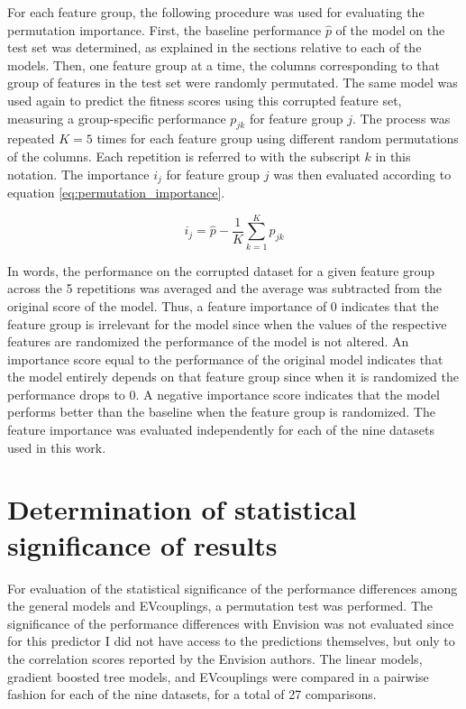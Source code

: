 For each feature group, the following procedure was used for evaluating the permutation importance.
First, the baseline performance $\hat{p}$ of the model on the test set was determined, as explained in the sections relative to each of the models.
Then, one feature group at a time, the columns corresponding to that group of features in the test set were randomly permutated.
The same model was used again to predict the fitness scores using this corrupted feature set, measuring a group-specific performance $p_{jk}$ for feature group $j$.
The process was repeated $K=5$ times for each feature group using different random permutations of the columns.
Each repetition is referred to with the subscript $k$ in this notation.
The importance $i_j$ for feature group $j$ was then evaluated according to equation \autoref{eq:permutation_importance}.

\begin{equation}\label{eq:permutation_importance}
	i_j = \hat{p} - \frac{1}{K} \sum_{k=1}^K p_{jk}
\end{equation}

In words, the performance on the corrupted dataset for a given feature group across the \num{5} repetitions was averaged and the average was subtracted from the original score of the model.
Thus, a feature importance of \num{0} indicates that the feature group is irrelevant for the model since when the values of the respective features are randomized the performance of the model is not altered.
An importance score equal to the performance of the original model indicates that the model entirely depends on that feature group since when it is randomized the performance drops to \num{0}.
A negative importance score indicates that the model performs better than the baseline when the feature group is randomized.
The feature importance was evaluated independently for each of the nine datasets used in this work.

\section{Determination of statistical significance of results}\label{mm:significance}
For evaluation of the statistical significance of the performance differences among the general models and EVcouplings, a permutation test was performed.
The significance of the performance differences with Envision was not evaluated since for this predictor I did not have access to the predictions themselves, but only to the correlation scores reported by the Envision authors.
The linear models, gradient boosted tree models, and EVcouplings were compared in a pairwise fashion for each of the nine datasets, for a total of \num{27} comparisons.

